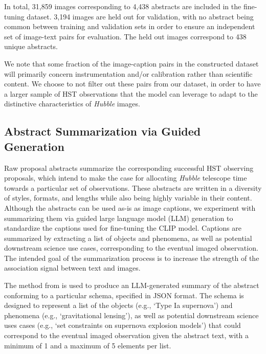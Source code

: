 \documentclass[10pt]{article} %
\newcommand{\hubble}{\emph{Hubble}\xspace}
\begin{document}
In total, 31,859 images corresponding to 4,438 abstracts are included in the fine-tuning dataset.
%
3,194 images are held out for validation, with no abstract being common between training and validation sets in order to ensure an independent set of image-text pairs for evaluation. The held out images correspond to 438 unique abstracts.  %

We note that some fraction of the image-caption pairs in the constructed dataset will primarily concern instrumentation and/or calibration rather than scientific content.
%
We choose to not filter out these pairs from our dataset, in order to have a larger sample of HST observations that the model can leverage to adapt to the distinctive characteristics of \hubble images.


\subsection{Abstract Summarization via Guided Generation}
\label{sec:summarization}

Raw proposal abstracts summarize the corresponding successful HST observing proposals, which intend to make the case for allocating \hubble telescope time towards a particular set of observations.
%
These abstracts are written in a diversity of styles, formats, and lengths while also being highly variable in their content.
%
Although the abstracts can be used as-is as image captions, we experiment with summarizing them via guided large language model (LLM) generation to standardize the captions used for fine-tuning the CLIP model.
%
Captions are summarized by extracting a list of objects and phenomena, as well as potential downstream science use cases, corresponding to the eventual imaged observation.
The intended goal of the summarization process is to increase the strength of the association signal between text and images.

The method from \cite{willard2023efficient} is used to produce an LLM-generated summary of the abstract conforming to a particular schema, specified in JSON format.
%
The schema is designed to represent a list of the objects (e.g., `Type Ia supernova') and phenomena (e.g., `gravitational lensing'), as well as potential downstream science uses cases (e.g., `set constraints on supernova explosion models') that could correspond to the eventual imaged observation given the abstract text, with a minimum of 1 and a maximum of 5 elements per list.
\end{document}
